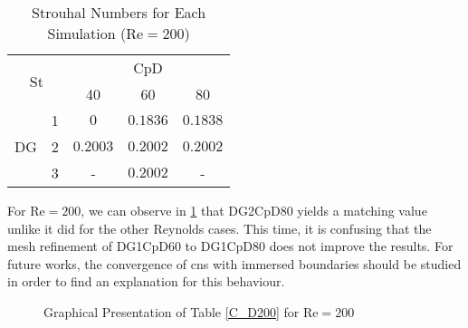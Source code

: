 \begin{table}[htp]
	\centering
	\def\arraystretch{1.5}
	\begin{tabular}{|c|c|c|c|c|}
		\hline
		\multicolumn{2}{|c|}{\multirow{2}{*}{St}} & \multicolumn{3}{c|}{CpD} \\ \cline{3-5} 
		\multicolumn{2}{|c|}{}                       & 40     & 60    & 80    \\ \hline
		\multirow{3}{*}{DG}            & 1           &    $0$    &    $0.1836$   &    $0.1838$    \\ \cline{2-5} 
		& 2           &     $0.2003$   &    $0.2002$   &     $0.2002$   \\ \cline{2-5} 
		& 3           &     -   &    $0.2002$   &    -    \\ \hline
	\end{tabular}
	\caption{Strouhal Numbers for Each Simulation ($\text{Re} = 200$)}	
	\label{Str200}
\end{table}
\newpage
For $\text{Re}=200$, we can observe in \cref{fig:C_D200} that DG2CpD80 yields a matching value unlike it did for the other Reynolds cases. This time, it is confusing that the mesh refinement of DG1CpD60 to DG1CpD80 does not improve the results. For future works, the convergence of \gls{cns} with immersed boundaries should be studied in order to find an explanation for this behaviour.
\begin{figure}[htp]	
	\centering
	\caption{Graphical Presentation of Table \ref{C_D200} for $\text{Re} = 200$}
	\label{fig:C_D200}	
\end{figure}

